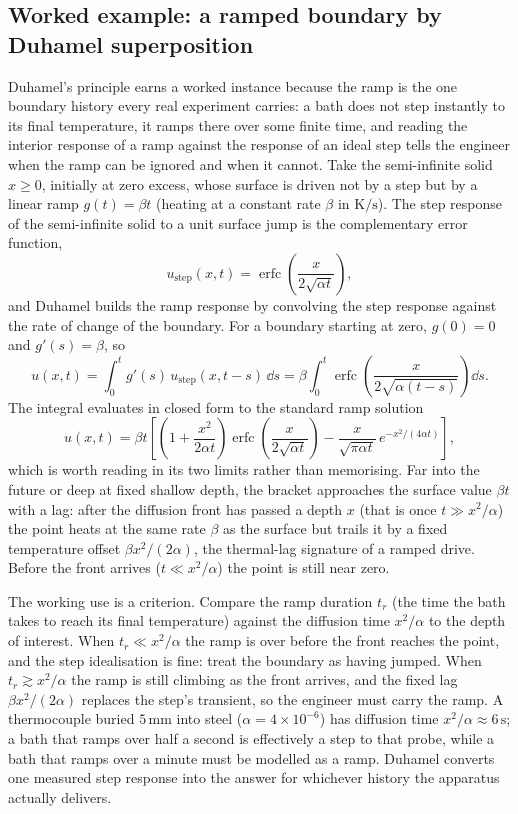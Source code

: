 \subsection{Worked example: a ramped boundary by Duhamel superposition}

Duhamel's principle earns a worked instance because the ramp is the
one boundary history every real experiment carries: a bath does not
step instantly to its final temperature, it ramps there over some
finite time, and reading the interior response of a ramp against the
response of an ideal step tells the engineer when the ramp can be
ignored and when it cannot. Take the semi-infinite solid $x \geq 0$,
initially at zero excess, whose surface is driven not by a step but by
a linear ramp $g(t) = \beta t$ (heating at a constant rate $\beta$ in
$\si{\kelvin\per\second}$). The step response of the semi-infinite
solid to a unit surface jump is the complementary error function,
\[
u_{\text{step}}(x, t) = \operatorname{erfc}\!\left(\frac{x}{2\sqrt{\alpha t}}\right),
\]
and Duhamel builds the ramp response by convolving the step response
against the rate of change of the boundary. For a boundary starting at
zero, $g(0) = 0$ and $g'(s) = \beta$, so
\[
u(x, t) = \int_{0}^{t} g'(s)\, u_{\text{step}}(x, t - s)\,\dd s
        = \beta\int_{0}^{t} \operatorname{erfc}\!\left(\frac{x}{2\sqrt{\alpha(t-s)}}\right)\dd s.
\]
The integral evaluates in closed form to the standard ramp solution
\[
u(x, t) = \beta t\left[\left(1 + \frac{x^{2}}{2\alpha t}\right)
\operatorname{erfc}\!\left(\frac{x}{2\sqrt{\alpha t}}\right)
- \frac{x}{\sqrt{\pi\alpha t}}\,e^{-x^{2}/(4\alpha t)}\right],
\]
which is worth reading in its two limits rather than memorising. Far
into the future or deep at fixed shallow depth, the bracket approaches
the surface value $\beta t$ with a lag: after the diffusion front has
passed a depth $x$ (that is once $t \gg x^{2}/\alpha$) the point heats
at the same rate $\beta$ as the surface but trails it by a fixed
temperature offset $\beta x^{2}/(2\alpha)$, the thermal-lag signature
of a ramped drive. Before the front arrives ($t \ll x^{2}/\alpha$) the
point is still near zero.

The working use is a criterion. Compare the ramp duration $t_{r}$
(the time the bath takes to reach its final temperature) against the
diffusion time $x^{2}/\alpha$ to the depth of interest. When
$t_{r} \ll x^{2}/\alpha$ the ramp is over before the front reaches the
point, and the step idealisation is fine: treat the boundary as having
jumped. When $t_{r} \gtrsim x^{2}/\alpha$ the ramp is still climbing as
the front arrives, and the fixed lag $\beta x^{2}/(2\alpha)$ replaces
the step's transient, so the engineer must carry the ramp. A
thermocouple buried $5\,\si{\milli\meter}$ into steel ($\alpha =
4\times 10^{-6}$) has diffusion time $x^{2}/\alpha \approx 6\,\si{
\second}$; a bath that ramps over half a second is effectively a step
to that probe, while a bath that ramps over a minute must be modelled
as a ramp. Duhamel converts one measured step response into the answer
for whichever history the apparatus actually delivers.

